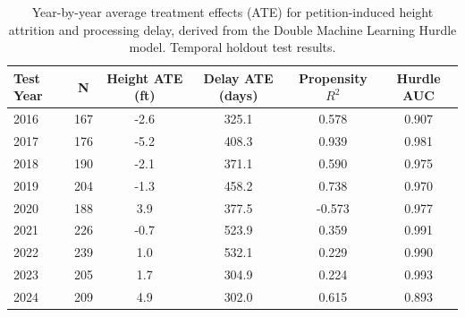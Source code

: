 \begin{table}[H]
\centering
\begin{tabular}{l c c c c c}
\toprule
\textbf{Test Year} & \textbf{N} & \textbf{Height ATE (ft)} & \textbf{Delay ATE (days)} & \textbf{Propensity $R^2$} & \textbf{Hurdle AUC} \\
\midrule
2016 & 167 & -2.6 & 325.1 & 0.578 & 0.907 \\
2017 & 176 & -5.2 & 408.3 & 0.939 & 0.981 \\
2018 & 190 & -2.1 & 371.1 & 0.590 & 0.975 \\
2019 & 204 & -1.3 & 458.2 & 0.738 & 0.970 \\
2020 & 188 & 3.9 & 377.5 & -0.573 & 0.977 \\
2021 & 226 & -0.7 & 523.9 & 0.359 & 0.991 \\
2022 & 239 & 1.0 & 532.1 & 0.229 & 0.990 \\
2023 & 205 & 1.7 & 304.9 & 0.224 & 0.993 \\
2024 & 209 & 4.9 & 302.0 & 0.615 & 0.893 \\
\bottomrule
\end{tabular}
\caption[Year-by-Year Average Treatment Effects]{Year-by-year average treatment effects (ATE) for petition-induced height attrition and processing delay, derived from the Double Machine Learning Hurdle model. Temporal holdout test results.}
\label{tab:dml_yearly_ate}
\end{table}

